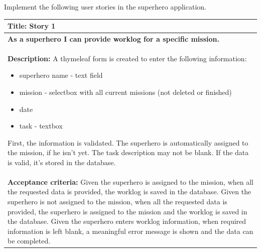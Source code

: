 \begin{oefening}

Implement the following user stories in the superhero application. 

\begin{tabularx}{\textwidth}{| X |}
\hline
\textbf{Title:} Story 1\\
\hline
\textbf{As a superhero I can provide worklog for a specific mission.}\\
\hline
\textbf{Description:} A thymeleaf form is created to enter the following information:
\begin{itemize}
\item superhero name  - text field
\item mission - selectbox with all current missions (not deleted or finished)
\item date
\item task - textbox 
\end{itemize}
First, the information is validated.  The superhero is automatically assigned to the mission, if he isn't yet.  The task description may not be blank. If the data is valid, it's stored in the database. \\
\hline
\textbf{Acceptance criteria:}
Given the superhero is assigned to the mission,\newline
when all the requested data is provided,\newline
the worklog is saved in the database.\newline
Given the superhero is not assigned to the mission,\newline
when all the requested data is provided,\newline
the superhero is assigned to the mission and the worklog is saved in the database.\newline
Given the superhero enters worklog information,\newline
when required information is left blank,\newline
a meaningful error message is shown\newline
and the data can be completed.\\
\hline
\end{tabularx}


\end{oefening}
